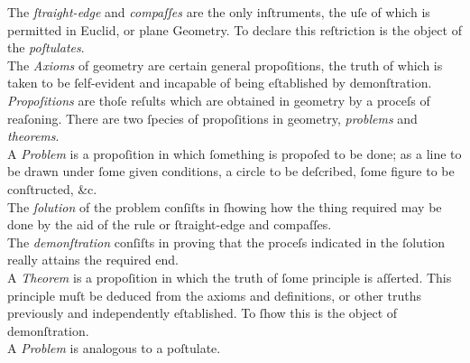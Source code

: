 \begin{minipage}{0.20\textwidth}
    \phantom{}
\end{minipage}%
\begin{minipage}{0.80\textwidth}
    The \textit{ſtraight-edge} and \textit{compaſſes} are the only inſtruments, the uſe of which is permitted in Euclid, or plane Geometry. To declare this reſtriction is the object of the \textit{poſtulates}.\\

    The \textit{Axioms} of geometry are certain general propoſitions, the truth of which is taken to be ſelf-evident and incapable of being eſtablished by demonſtration.\\

    \textit{Propoſitions} are thoſe reſults which are obtained in geometry by a proceſs of reaſoning. There are two ſpecies of propoſitions in geometry, \textit{problems} and \textit{theorems}.\\

    A \textit{Problem} is a propoſition in which ſomething is propoſed to be done; as a line to be drawn under ſome given conditions, a circle to be deſcribed, ſome figure to be conſtructed, \&c.\\

    The \textit{ſolution} of the problem conſiſts in ſhowing how the thing required may be done by the aid of the rule or ſtraight-edge and compaſſes.\\

    The \textit{demonſtration} conſiſts in proving that the proceſs indicated in the ſolution really attains the required end.\\

    A \textit{Theorem} is a propoſition in which the truth of ſome principle is aſſerted. This principle muſt be deduced from the axioms and definitions, or other truths previously and independently eſtablished. To ſhow this is the object of demonſtration.\\

    A \textit{Problem} is analogous to a poſtulate.
\end{minipage}

\hfill

